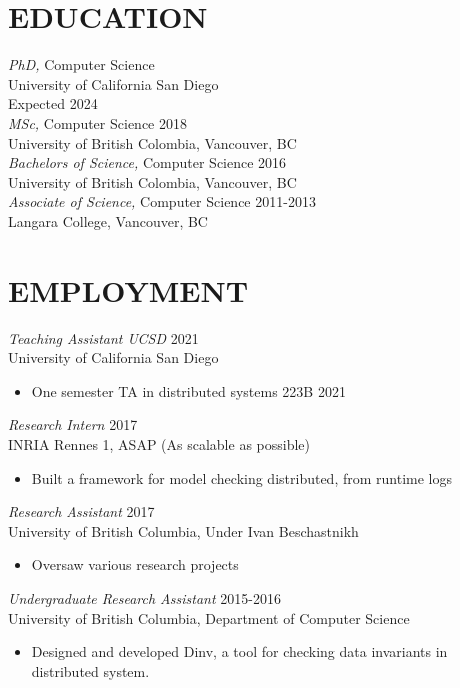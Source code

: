 \documentclass[line,margin]{res}
\begin{document}
\begin{resume}
{\section{EDUCATION}
{\sl PhD,} Computer Science \\
University of California San Diego \\
Expected 2024 \\

{\sl MSc,} Computer Science \hfill 2018 \\
University of British Colombia, Vancouver, BC \\

{\sl Bachelors of Science,} Computer Science	\hfill 2016\\
University of British Colombia, Vancouver, BC \\

{\sl Associate of Science,} Computer Science \hfill 2011-2013\\
Langara College, Vancouver, BC\\


\section{EMPLOYMENT} 

{\sl Teaching Assistant UCSD} \hfill 2021\\
	University of California San Diego
\begin{itemize} \itemsep -2pt
        \item One semester TA in distributed systems 223B \hfill 2021
	\end{itemize}

{\sl Research Intern} \hfill 2017\\
    INRIA Rennes 1, ASAP (As scalable as possible)
\begin{itemize} \itemsep -2pt
        \item Built a framework for model checking distributed, from runtime logs
    \end{itemize}

{\sl Research Assistant} \hfill 2017\\
    University of British Columbia, Under Ivan Beschastnikh
\begin{itemize} \itemsep -2pt
        \item Oversaw various research projects
    \end{itemize}

{\sl Undergraduate Research Assistant} \hfill 2015-2016\\
	University of British Columbia, Department of Computer Science
\begin{itemize} \itemsep -2pt
        \item Designed and developed Dinv, a tool for checking data invariants in distributed system.
    \end{itemize}


}
\end{resume}
\end{document}

